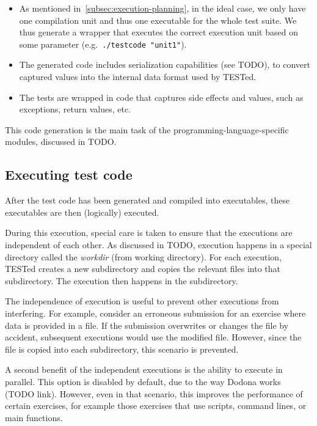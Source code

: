 \documentclass[../main]{subfiles}
\begin{document}
\begin{itemize}
    \item As mentioned in~\cref{subsec:execution-planning}, in the ideal case, we only have one compilation unit and thus one executable for the whole test suite.
     We thus generate a wrapper that executes the correct execution unit based on some parameter (e.g.\ \texttt{./testcode "unit1"}).
    \item The generated code includes serialization capabilities (see TODO), to convert captured values into the internal data format used by TESTed.
    \item The tests are wrapped in code that captures side effects and values, such as exceptions, return values, etc.
\end{itemize}

This code generation is the main task of the programming-language-specific modules, discussed in TODO.

\subsection{Executing test code}\label{subsec:executing-test-code}

After the test code has been generated and compiled into executables, these executables are then (logically) executed.

During this execution, special care is taken to ensure that the executions are independent of each other.
As discussed in TODO, execution happens in a special directory called the \emph{workdir} (from working directory).
For each execution, TESTed creates a new subdirectory and copies the relevant files into that subdirectory.
The execution then happens in the subdirectory.

The independence of execution is useful to prevent other executions from interfering.
For example, consider an erroneous submission for an exercise where data is provided in a file.
If the submission overwrites or changes the file by accident, subsequent executions would use the modified file.
However, since the file is copied into each subdirectory, this scenario is prevented.

A second benefit of the independent executions is the ability to execute in parallel.
This option is disabled by default, due to the way Dodona works (TODO link).
However, even in that scenario, this improves the performance of certain exercises, for example those exercises that use scripts, command lines, or main functions.
\end{document}
